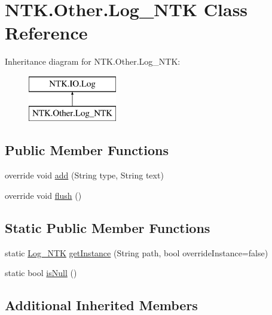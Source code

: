 \hypertarget{class_n_t_k_1_1_other_1_1_log___n_t_k}{}\section{N\+T\+K.\+Other.\+Log\+\_\+\+N\+TK Class Reference}
\label{class_n_t_k_1_1_other_1_1_log___n_t_k}


 


Inheritance diagram for N\+T\+K.\+Other.\+Log\+\_\+\+N\+TK\+:\begin{figure}[H]
\begin{center}
\leavevmode
\includegraphics[height=2.000000cm]{d9/d70/class_n_t_k_1_1_other_1_1_log___n_t_k}
\end{center}
\end{figure}
\subsection*{Public Member Functions}
\begin{DoxyCompactItemize}
\item 
override void \mbox{\hyperlink{class_n_t_k_1_1_other_1_1_log___n_t_k_a30a4176c672c4325ca09a068f26a221c}{add}} (String type, String text)
\item 
override void \mbox{\hyperlink{class_n_t_k_1_1_other_1_1_log___n_t_k_acd0d0f0a9ceefbb23da69394d7153632}{flush}} ()
\end{DoxyCompactItemize}
\subsection*{Static Public Member Functions}
\begin{DoxyCompactItemize}
\item 
static \mbox{\hyperlink{class_n_t_k_1_1_other_1_1_log___n_t_k}{Log\+\_\+\+N\+TK}} \mbox{\hyperlink{class_n_t_k_1_1_other_1_1_log___n_t_k_aad60827b3ba41438dc44d5f9016d418d}{get\+Instance}} (String path, bool override\+Instance=false)
\item 
static bool \mbox{\hyperlink{class_n_t_k_1_1_other_1_1_log___n_t_k_afea2136df13554bf772aaa5d879d96a1}{is\+Null}} ()
\end{DoxyCompactItemize}
\subsection*{Additional Inherited Members}


